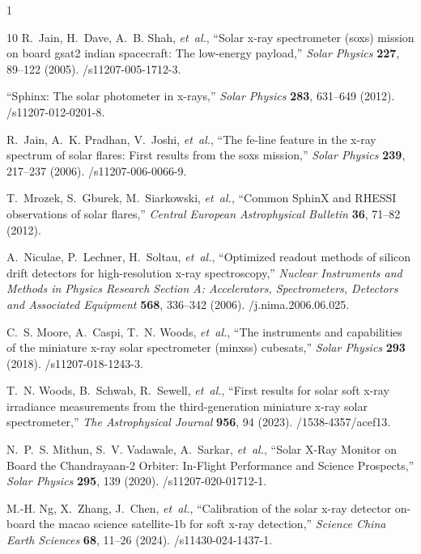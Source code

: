 \documentclass[12pt]{spieman}  %
\newcommand{\solphys}{Solar Physics}
\begin{document}
\begin{spacing}{1}
\begin{thebibliography}{10}
R.~Jain, H.~Dave, A.~B. Shah, {\em et~al.}, ``Solar x-ray spectrometer (soxs) mission on board gsat2 indian spacecraft: The low-energy payload,'' {\em Solar Physics} {\bf 227}, 89–122  (2005).
/s11207-005-1712-3.

``Sphinx: The solar photometer in x-rays,'' {\em Solar Physics} {\bf 283}, 631–649  (2012).
/s11207-012-0201-8.

R.~Jain, A.~K. Pradhan, V.~Joshi, {\em et~al.}, ``The fe-line feature in the x-ray spectrum of solar flares: First results from the soxs mission,'' {\em Solar Physics} {\bf 239}, 217–237  (2006).
/s11207-006-0066-9.

T.~{Mrozek}, S.~{Gburek}, M.~{Siarkowski}, {\em et~al.}, ``{Common SphinX and RHESSI observations of solar flares},'' {\em Central European Astrophysical Bulletin} {\bf 36}, 71--82  (2012).

A.~Niculae, P.~Lechner, H.~Soltau, {\em et~al.}, ``Optimized readout methods of silicon drift detectors for high-resolution x-ray spectroscopy,'' {\em Nuclear Instruments and Methods in Physics Research Section A: Accelerators, Spectrometers, Detectors and Associated Equipment} {\bf 568}, 336–342  (2006).
/j.nima.2006.06.025.

C.~S. Moore, A.~Caspi, T.~N. Woods, {\em et~al.}, ``The instruments and capabilities of the miniature x-ray solar spectrometer (minxss) cubesats,'' {\em Solar Physics} {\bf 293}  (2018).
/s11207-018-1243-3.

T.~N. Woods, B.~Schwab, R.~Sewell, {\em et~al.}, ``First results for solar soft x-ray irradiance measurements from the third-generation miniature x-ray solar spectrometer,'' {\em The Astrophysical Journal} {\bf 956}, 94  (2023).
/1538-4357/acef13.

N.~P.~S. {Mithun}, S.~V. {Vadawale}, A.~{Sarkar}, {\em et~al.}, ``{Solar X-Ray Monitor on Board the Chandrayaan-2 Orbiter: In-Flight Performance and Science Prospects},'' {\em \solphys} {\bf 295}, 139  (2020).
/s11207-020-01712-1.

M.-H. Ng, X.~Zhang, J.~Chen, {\em et~al.}, ``Calibration of the solar x-ray detector on-board the macao science satellite-1b for soft x-ray detection,'' {\em Science China Earth Sciences} {\bf 68}, 11–26  (2024).
/s11430-024-1437-1.


\end{thebibliography}
\end{spacing}
\end{document}
